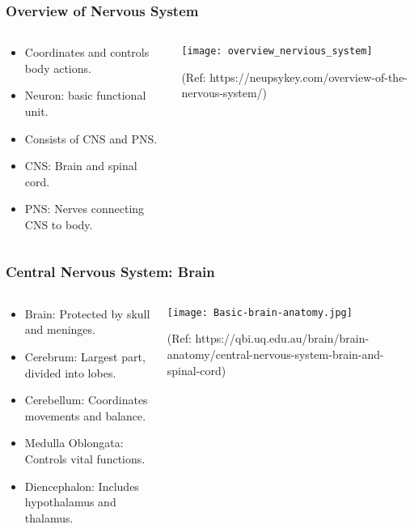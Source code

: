 \begin{frame}[fragile]\frametitle{Overview of Nervous System}
\begin{columns}
    \begin{column}[T]{0.5\linewidth}
      \begin{itemize}
		\item Coordinates and controls body actions.
		\item Neuron: basic functional unit.
		\item Consists of CNS and PNS.
		\item CNS: Brain and spinal cord.
		\item PNS: Nerves connecting CNS to body.
	  \end{itemize}
    \end{column}
    \begin{column}[T]{0.5\linewidth}
		\begin{center}
		\texttt{[image: overview\_nervious\_system]}
		
		{\tiny (Ref: https://neupsykey.com/overview-of-the-nervous-system/)}
		
		\end{center}	
    \end{column}
  \end{columns}
\end{frame}

\begin{frame}[fragile]\frametitle{Central Nervous System: Brain}
\begin{columns}
    \begin{column}[T]{0.5\linewidth}
      \begin{itemize}
		\item Brain: Protected by skull and meninges.
		\item Cerebrum: Largest part, divided into lobes.
		\item Cerebellum: Coordinates movements and balance.
		\item Medulla Oblongata: Controls vital functions.
		\item Diencephalon: Includes hypothalamus and thalamus.
	  \end{itemize}
    \end{column}
    \begin{column}[T]{0.5\linewidth}
		\begin{center}
		\texttt{[image: Basic-brain-anatomy.jpg]}
		
		{\tiny (Ref: https://qbi.uq.edu.au/brain/brain-anatomy/central-nervous-system-brain-and-spinal-cord)}
		
		\end{center}	
    \end{column}
  \end{columns}
\end{frame}

